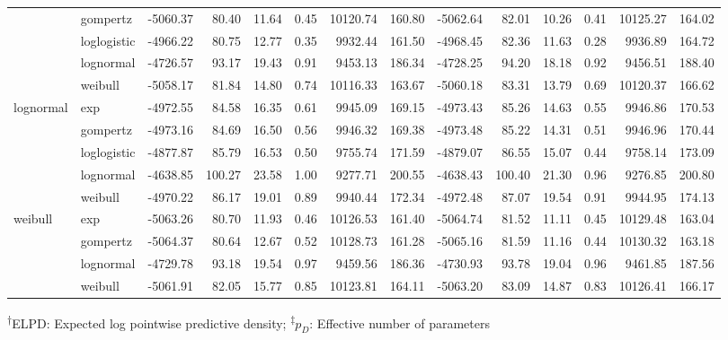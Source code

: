\documentclass[AMA,STIX1COL]{WileyNJD-v2}
\begin{document}
\begin{center}
\begin{table}[!ht]
\begin{tabular}{llrrrrrrrrrrrr}
 & gompertz & -5060.37 & 80.40 & 11.64 & 0.45 & 10120.74 & 160.80 & -5062.64 & 82.01 & 10.26 & 0.41 & 10125.27 & 164.02\\
 & loglogistic & -4966.22 & 80.75 & 12.77 & 0.35 & 9932.44 & 161.50 & -4968.45 & 82.36 & 11.63 & 0.28 & 9936.89 & 164.72\\
 & lognormal & -4726.57 & 93.17 & 19.43 & 0.91 & 9453.13 & 186.34 & -4728.25 & 94.20 & 18.18 & 0.92 & 9456.51 & 188.40\\
 & weibull & -5058.17 & 81.84 & 14.80 & 0.74 & 10116.33 & 163.67 & -5060.18 & 83.31 & 13.79 & 0.69 & 10120.37 & 166.62\\
lognormal & exp & -4972.55 & 84.58 & 16.35 & 0.61 & 9945.09 & 169.15 & -4973.43 & 85.26 & 14.63 & 0.55 & 9946.86 & 170.53\\
 & gompertz & -4973.16 & 84.69 & 16.50 & 0.56 & 9946.32 & 169.38 & -4973.48 & 85.22 & 14.31 & 0.51 & 9946.96 & 170.44\\
 & loglogistic & -4877.87 & 85.79 & 16.53 & 0.50 & 9755.74 & 171.59 & -4879.07 & 86.55 & 15.07 & 0.44 & 9758.14 & 173.09\\
 & lognormal & -4638.85 & 100.27 & 23.58 & 1.00 & 9277.71 & 200.55 & -4638.43 & 100.40 & 21.30 & 0.96 & 9276.85 & 200.80\\
 & weibull & -4970.22 & 86.17 & 19.01 & 0.89 & 9940.44 & 172.34 & -4972.48 & 87.07 & 19.54 & 0.91 & 9944.95 & 174.13\\
weibull & exp & -5063.26 & 80.70 & 11.93 & 0.46 & 10126.53 & 161.40 & -5064.74 & 81.52 & 11.11 & 0.45 & 10129.48 & 163.04\\
 & gompertz & -5064.37 & 80.64 & 12.67 & 0.52 & 10128.73 & 161.28 & -5065.16 & 81.59 & 11.16 & 0.44 & 10130.32 & 163.18\\
 & lognormal & -4729.78 & 93.18 & 19.54 & 0.97 & 9459.56 & 186.36 & -4730.93 & 93.78 & 19.04 & 0.96 & 9461.85 & 187.56\\
 & weibull & -5061.91 & 82.05 & 15.77 & 0.85 & 10123.81 & 164.11 & -5063.20 & 83.09 & 14.87 & 0.83 & 10126.41 & 166.17\\
\bottomrule
\end{tabular}
\begin{tablenotes}%
\textsuperscript{$\dagger$}ELPD: Expected log pointwise predictive density;
\textsuperscript{$\ddagger$}$p_D$: Effective number of parameters
\end{tablenotes}
\end{table}
\end{center}
\end{document}
